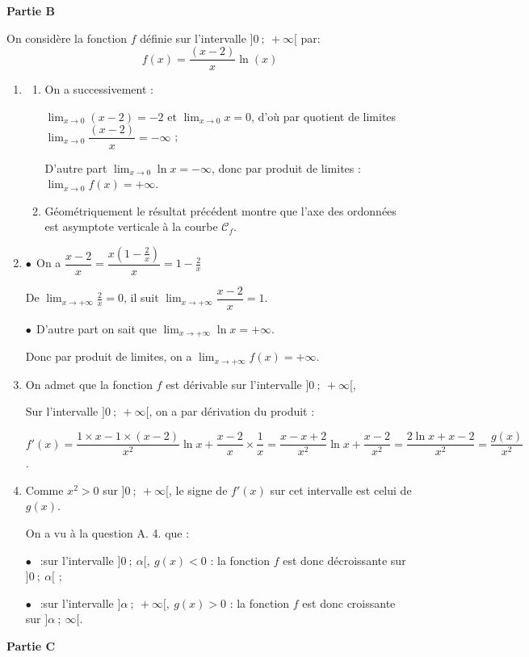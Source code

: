 \medskip

\textbf{Partie B}

\medskip

On considère la fonction $f$ définie sur l'intervalle $]0~;~+\infty[$ par:
\[f(x) = \dfrac{(x-2)}{x}\ln(x)\]

\begin{enumerate}
\item 
	\begin{enumerate}
		\item 
On a successivement :

$\displaystyle\lim_{x \to 0} (x - 2) = - 2$ et $\displaystyle\lim_{x \to 0} x  = 0$, d'où par quotient de limites $\displaystyle\lim_{x \to 0} \dfrac{(x - 2)}{x} = - \infty$ ;

D'autre part $\displaystyle\lim_{x \to 0} \ln x = - \infty$, donc par produit de limites : $\displaystyle\lim_{x \to 0} f(x) = + \infty.$
		\item 
		Géométriquement le résultat précédent montre que l'axe des ordonnées est asymptote verticale à la courbe $\mathcal{C}_f$.
	\end{enumerate}
\item 
$\bullet~~$On a $\dfrac{x - 2}{x} = \dfrac{x\left(1 - \frac2x\right)}{x} = 1 - \frac2x$

De $\displaystyle\lim_{x \to + \infty} \frac2x = 0$, il suit $\displaystyle\lim_{x \to + \infty}\dfrac{x - 2}{x} = 1$.

$\bullet~~$D'autre part on sait que $\displaystyle\lim_{x \to + \infty}\ln x = + \infty$. 

Donc par produit de limites, on a $\displaystyle\lim_{x \to + \infty}f(x) = + \infty$.
\item On admet que la fonction $f$ est dérivable sur l'intervalle $]0~;~+\infty[$,


Sur l'intervalle $]0~;~+\infty[$, on a par dérivation du produit :

$f'(x) = \dfrac{1 \times x - 1 \times (x - 2)}{x^2}\ln x + \dfrac{x - 2}{x} \times \dfrac1x = \dfrac{x - x + 2}{x^2}\ln x + \dfrac{x - 2}{x^2} = \dfrac{2\ln x + x - 2}{x^2} = \dfrac{g(x)}{x^2}$.
\item  
Comme $x^2 > 0$ sur $]0~;~+\infty[$, le signe de $f'(x)$ sur cet intervalle est celui de $g(x)$.

On a vu à la question A. 4. que :

$\bullet~~$ :sur l'intervalle $]0~;~\alpha[, \: g(x) < 0$ : la fonction $f$ est donc décroissante sur $]0~;~\alpha[$ ;

$\bullet~~$ :sur l'intervalle $]\alpha~;~+ \infty[, \: g(x) > 0$ : la fonction $f$ est donc croissante sur $]\alpha~;~\infty[$.
\end{enumerate}
\medskip
\textbf{Partie C}
\medskip


